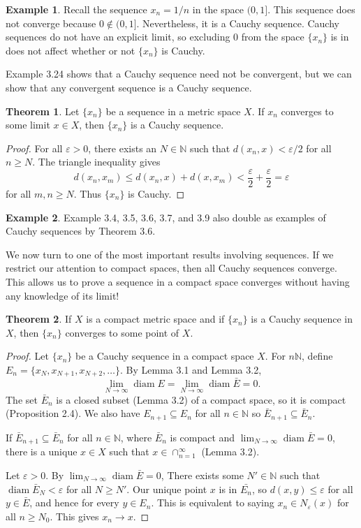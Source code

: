 \documentclass{article}
\newcommand{\N}{\mathbb{N}}
\DeclareMathOperator{\diam}{diam}
\theoremstyle{definition}
\newtheorem{theorem}{Theorem}[section]
\newtheorem{example}{Example}[section]
\begin{document}
\begin{example}
	Recall the sequence $ x_n=1/n $ in the space $ (0,1] $. This sequence does not converge because $ 0\notin(0,1] $. Nevertheless, it is a Cauchy sequence. Cauchy sequences do not have an explicit limit, so excluding $ 0 $ from the space $ \{x_n\} $ is in does not affect whether or not $ \{x_n\} $ is Cauchy.
\end{example}
Example 3.24 shows that a Cauchy sequence need not be convergent, but we can show that any convergent sequence is a Cauchy sequence.
\begin{theorem}
	Let $ \{x_n\} $ be a sequence in a metric space $ X $. If $ x_n $ converges to some limit $ x\in X $, then $ \{x_n\} $ is a Cauchy sequence. 
\end{theorem} 
\begin{proof}
	For all $ \varepsilon>0 $, there exists an $ N\in\N $ such that $ d(x_n,x)<\varepsilon/2 $ for all $ n\ge N $. The triangle inequality gives $$d(x_n,x_m)\le d(x_n,x)+d(x,x_m)<\frac{\varepsilon}{2}+\frac{\varepsilon}{2}=\varepsilon $$ for all $ m,n\ge N $. Thus $ \{x_n\} $ is Cauchy. 
\end{proof}
\begin{example}
	Example 3.4, 3.5, 3.6, 3.7, and 3.9 also double as examples of Cauchy sequences by Theorem 3.6.
\end{example}
We now turn to one of the most important results involving sequences. If we restrict our attention to compact spaces, then all Cauchy sequences converge. This allows us to prove a sequence in a compact space converges without having any knowledge of its limit! 
\begin{theorem}
	If $ X $ is a compact metric space and if $ \{x_n\} $ is a Cauchy sequence in $ X $, then $ \{x_n\} $ converges to some point of $ X $.
\end{theorem}
\begin{proof}
Let $ \{x_n\} $ be a Cauchy sequence in a compact space $ X $. For $ n\N $, define $ E_n=\{x_N,x_{N+1},x_{N+2},\ldots\} $. By Lemma 3.1 and Lemma 3.2, $$ \lim_{N\to\infty} \diam E=\lim_{N\to\infty} \diam\bar{E}=0. $$ The set $ \bar{E}_n $ is a closed subset (Lemma 3.2) of a compact space, so it is compact (Proposition 2.4). We also have $ E_{n+1}\subseteq E_n $ for all $ n\in\N $ so $ \bar{E}_{n+1}\subseteq \bar{E}_n $.

 If  $ \bar{E}_{n+1}\subseteq \bar{E}_n $ for all $ n\in\N $, where $ \bar{E}_n $ is compact and 	$ \lim_{N\to\infty} \diam\bar{E}=0 $, there is a unique $ x\in X $ such that $ x\in\cap_{n=1}^\infty $  (Lemma 3.2). 

Let $ \varepsilon>0 $. By $ \lim_{N\to\infty} \diam\bar{E}=0 $, There exists some $ N'\in\N $ such that $ \diam\bar{E}_N<\varepsilon $ for all $ N\ge N' $. Our unique point $ x $ is in $ \bar{E_n} $, so $ d(x,y)\le\varepsilon $ for all $ y\in\bar{E} $, and hence for every $ y\in E_n $. This is equivalent to saying $ x_n\in N_\varepsilon(x) $ for all $ n\ge N_0 $. This gives $ x_n\to x $. 
\end{proof}
\end{document}
